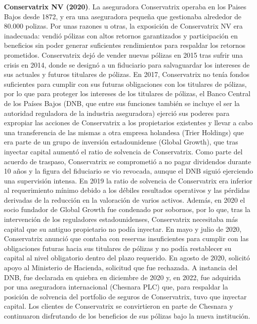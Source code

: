 \documentclass[10pt,a4paper]{article}
\begin{document}
\textbf{Conservatrix NV (2020)}. La aseguradora Conservatrix operaba en los Paises Bajos desde 1872, y era una aseguradora pequeña que gestionaba alrededor de 80.000 polizas. Por unas razones u otras, la exposición de Conservatrix NV era inadecuada: vendió pólizas con altos retornos garantizados y participación en beneficios sin poder generar suficientes rendimientos para respaldar los retornos prometidos. Conservatrix dejó de vender nuevas pólizas en 2015 tras sufrir una crisis en 2014, donde se designó a un fiduciario para salvaguardar los intereses de sus actuales y futuros titulares de pólizas. En 2017, Conservatrix no tenía fondos suficientes para cumplir con sus futuras obligaciones con los titulares de pólizas, por lo que para proteger los intereses de los titulares de pólizas, el Banco Central de los Países Bajos (DNB, que entre sus funciones también se incluye el ser la autoridad reguladora de la industria aseguradora) ejerció sus poderes para expropiar las acciones de Conservatrix a los propietarios existentes y llevar a cabo una transferencia de las mismas a otra empresa holandesa (Trier Holdings) que era parte de un grupo de inversión estadounidense (Global Growth), que tras inyectar capital aumentó el ratio de solvencia de Conservatrix. Como parte del acuerdo de traspaso, Conservatrix se comprometió a no pagar dividendos durante 10 años y la figura del fiduciario se vio revocada, aunque el DNB siguió ejerciendo una supervisión intensa. En 2019 la ratio de solvencia de Conservatrix era inferior al requerimiento mínimo debido a los débiles resultados operativos y las pérdidas derivadas de la reducción en la valoración de varios activos. Además, en 2020 el socio fundador de Global Growth fue condenado por sobornos, por lo que, tras la intervención de los reguladores estadounidenses, Conservatrix necesitaba más capital que su antiguo propietario no podía inyectar. En mayo y julio de 2020, Conservatrix anunció que contaba con reservas insuficientes para cumplir con las obligaciones futuras hacia sus titulares de pólizas y no podía restablecer su capital al nivel obligatorio dentro del plazo requerido. En agosto de 2020, solicitó apoyo al Ministerio de Hacienda, solicitud que fue rechazada. A instancia del DNB, fue declarada en quiebra en diciembre de 2020 y, en 2022, fue adquirida por una aseguradora internacional (Chesnara PLC) que, para respaldar la posición de solvencia del portfolio de seguros de Conservatrix, tuvo que inyectar capital. Los clientes de Conservatrix se convirtieron en parte de Chesnara y continuaron disfrutando de los beneficios de sus pólizas bajo la nueva institución.
\end{document}
